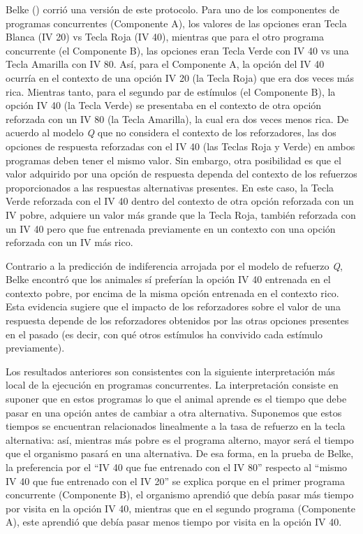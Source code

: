 \documentclass[
  letterpaper,
]{book}
\begin{document}
Belke () corrió una versión de este protocolo. Para uno de los
componentes de programas concurrentes (Componente A), los valores de las
opciones eran Tecla Blanca (IV 20) vs Tecla Roja (IV 40), mientras que
para el otro programa concurrente (el Componente B), las opciones eran
Tecla Verde con IV 40 vs una Tecla Amarilla con IV 80. Así, para el
Componente A, la opción del IV 40 ocurría en el contexto de una opción
IV 20 (la Tecla Roja) que era dos veces más rica. Mientras tanto, para
el segundo par de estímulos (el Componente B), la opción IV 40 (la Tecla
Verde) se presentaba en el contexto de otra opción reforzada con un IV
80 (la Tecla Amarilla), la cual era dos veces menos rica. De acuerdo al
modelo \emph{Q} que no considera el contexto de los reforzadores, las
dos opciones de respuesta reforzadas con el IV 40 (las Teclas Roja y
Verde) en ambos programas deben tener el mismo valor. Sin embargo, otra
posibilidad es que el valor adquirido por una opción de respuesta
dependa del contexto de los refuerzos proporcionados a las respuestas
alternativas presentes. En este caso, la Tecla Verde reforzada con el IV
40 dentro del contexto de otra opción reforzada con un IV pobre,
adquiere un valor más grande que la Tecla Roja, también reforzada con un
IV 40 pero que fue entrenada previamente en un contexto con una opción
reforzada con un IV más rico.

Contrario a la predicción de indiferencia arrojada por el modelo de
refuerzo \emph{Q}, Belke encontró que los animales sí preferían la
opción IV 40 entrenada en el contexto pobre, por encima de la misma
opción entrenada en el contexto rico. Esta evidencia sugiere que el
impacto de los reforzadores sobre el valor de una respuesta depende de
los reforzadores obtenidos por las otras opciones presentes en el pasado
(es decir, con qué otros estímulos ha convivido cada estímulo
previamente).

Los resultados anteriores son consistentes con la siguiente
interpretación más local de la ejecución en programas concurrentes. La
interpretación consiste en suponer que en estos programas lo que el
animal aprende es el tiempo que debe pasar en una opción antes de
cambiar a otra alternativa. Suponemos que estos tiempos se encuentran
relacionados linealmente a la tasa de refuerzo en la tecla alternativa:
así, mientras más pobre es el programa alterno, mayor será el tiempo que
el organismo pasará en una alternativa. De esa forma, en la prueba de
Belke, la preferencia por el ``IV 40 que fue entrenado con el IV 80''
respecto al ``mismo IV 40 que fue entrenado con el IV 20'' se explica
porque en el primer programa concurrente (Componente B), el organismo
aprendió que debía pasar más tiempo por visita en la opción IV 40,
mientras que en el segundo programa (Componente A), este aprendió que
debía pasar menos tiempo por visita en la opción IV 40.
\end{document}
